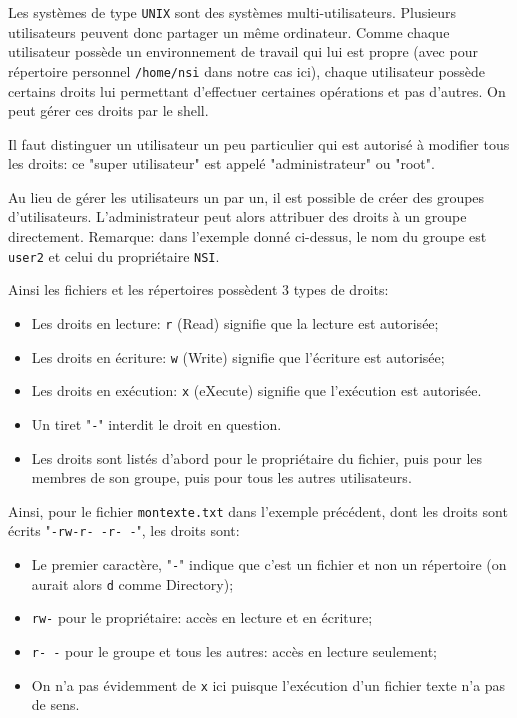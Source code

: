 \documentclass[12pt]{article}
\begin{document}
	Les systèmes de type \texttt{UNIX} sont des systèmes multi-utilisateurs. Plusieurs utilisateurs peuvent donc partager un même ordinateur. Comme chaque utilisateur possède un environnement de travail qui lui est propre (avec pour répertoire personnel \texttt{/home/nsi} dans notre cas ici), chaque utilisateur possède certains droits lui permettant d'effectuer certaines opérations et pas d'autres. On peut gérer ces droits par le shell.
	
	Il faut distinguer un utilisateur un peu particulier qui est autorisé à modifier tous les droits: ce "super utilisateur" est appelé "administrateur" ou "root".
	
	Au lieu de gérer les utilisateurs un par un, il est possible de créer des groupes d'utilisateurs. L'administrateur peut alors attribuer des droits à un groupe directement. Remarque: dans l'exemple donné ci-dessus, le nom du groupe est \texttt{user2} et celui du propriétaire \texttt{NSI}.
	
	Ainsi les fichiers et les répertoires possèdent 3 types de droits:
	\begin{itemize}
		\item Les droits en lecture: \texttt{r} (Read) signifie que la lecture est autorisée;
		\item Les droits en écriture: \texttt{w} (Write) signifie que l'écriture est autorisée;
		\item Les droits en exécution: \texttt{x} (eXecute) signifie que l'exécution est autorisée.
		\item Un tiret "\texttt{-}" interdit le droit en question.
		\item Les droits sont listés d'abord pour le propriétaire du fichier, puis pour les membres de son groupe, puis pour tous les autres utilisateurs.
	\end{itemize}
	
	Ainsi, pour le fichier \texttt{montexte.txt} dans l'exemple précédent, dont les droits sont écrits "\texttt{-rw-r-\,-r-\,-}", les droits sont:
	\begin{itemize}
		\item Le premier caractère, "\texttt{-}" indique que c'est un fichier et non un répertoire (on aurait alors \texttt{d} comme Directory);
		\item \texttt{rw-} pour le propriétaire: accès en lecture et en écriture;
		\item \texttt{r-\,-} pour le groupe et tous les autres: accès en lecture seulement;
		\item On n'a pas évidemment de \texttt{x} ici puisque l'exécution d'un fichier texte n'a pas de sens.
	\end{itemize}
	
\end{document}
